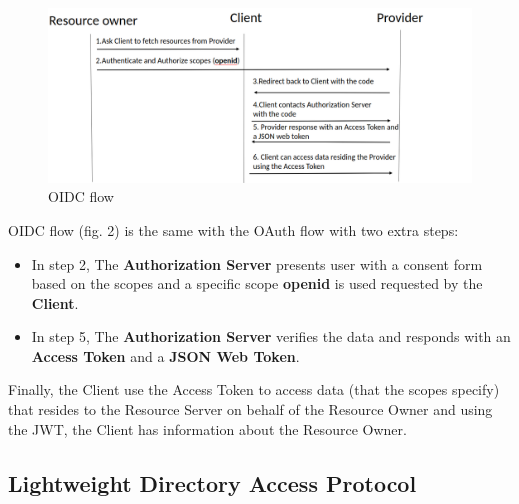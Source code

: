\begin{figure}[htb]
	\centering
	\includegraphics[scale=0.4]{figures/OIDC.png}
	\caption{OIDC flow}
\end{figure}

OIDC flow (fig. 2) is the same with the OAuth flow with two extra steps:

\begin{itemize}
	
	\item In step 2, The \textbf{Authorization Server} presents user with a consent form based on the scopes and a specific scope \textbf{openid} is used requested by the \textbf{Client}.
	
	\item In step 5, The \textbf{Authorization Server} verifies the data and responds with an \textbf{Access Token} and a \textbf{JSON Web Token}.
\end{itemize}	

Finally, the Client use the Access Token to access data (that the scopes specify) that resides to the Resource Server on behalf of the Resource Owner and using the JWT, the Client has information about the Resource Owner.
	

\subsection{Lightweight Directory Access Protocol}

